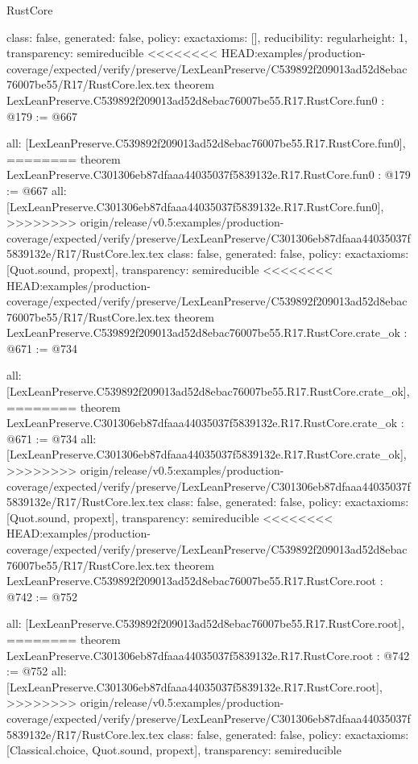 \begin{lexlean}{RustCore}
\begin{coremodule}
{\begin{coremodule}
{{{  class: false,
  generated: false,
  policy: exact{axioms: []},
  reducibility: regular{height: 1},
  transparency: semireducible
}
<<<<<<<< HEAD:examples/production-coverage/expected/verify/preserve/LexLeanPreserve/C539892f209013ad52d8ebac76007be55/R17/RustCore.lex.tex
theorem LexLeanPreserve.C539892f209013ad52d8ebac76007be55.R17.RustCore.fun0 : @179 := @667 {
  all: [LexLeanPreserve.C539892f209013ad52d8ebac76007be55.R17.RustCore.fun0],
========
theorem LexLeanPreserve.C301306eb87dfaaa44035037f5839132e.R17.RustCore.fun0 : @179 := @667 {
  all: [LexLeanPreserve.C301306eb87dfaaa44035037f5839132e.R17.RustCore.fun0],
>>>>>>>> origin/release/v0.5:examples/production-coverage/expected/verify/preserve/LexLeanPreserve/C301306eb87dfaaa44035037f5839132e/R17/RustCore.lex.tex
  class: false,
  generated: false,
  policy: exact{axioms: [Quot.sound, propext]},
  transparency: semireducible
}
<<<<<<<< HEAD:examples/production-coverage/expected/verify/preserve/LexLeanPreserve/C539892f209013ad52d8ebac76007be55/R17/RustCore.lex.tex
theorem LexLeanPreserve.C539892f209013ad52d8ebac76007be55.R17.RustCore.crate_ok : @671 := @734 {
  all: [LexLeanPreserve.C539892f209013ad52d8ebac76007be55.R17.RustCore.crate_ok],
========
theorem LexLeanPreserve.C301306eb87dfaaa44035037f5839132e.R17.RustCore.crate_ok : @671 := @734 {
  all: [LexLeanPreserve.C301306eb87dfaaa44035037f5839132e.R17.RustCore.crate_ok],
>>>>>>>> origin/release/v0.5:examples/production-coverage/expected/verify/preserve/LexLeanPreserve/C301306eb87dfaaa44035037f5839132e/R17/RustCore.lex.tex
  class: false,
  generated: false,
  policy: exact{axioms: [Quot.sound, propext]},
  transparency: semireducible
}
<<<<<<<< HEAD:examples/production-coverage/expected/verify/preserve/LexLeanPreserve/C539892f209013ad52d8ebac76007be55/R17/RustCore.lex.tex
theorem LexLeanPreserve.C539892f209013ad52d8ebac76007be55.R17.RustCore.root : @742 := @752 {
  all: [LexLeanPreserve.C539892f209013ad52d8ebac76007be55.R17.RustCore.root],
========
theorem LexLeanPreserve.C301306eb87dfaaa44035037f5839132e.R17.RustCore.root : @742 := @752 {
  all: [LexLeanPreserve.C301306eb87dfaaa44035037f5839132e.R17.RustCore.root],
>>>>>>>> origin/release/v0.5:examples/production-coverage/expected/verify/preserve/LexLeanPreserve/C301306eb87dfaaa44035037f5839132e/R17/RustCore.lex.tex
  class: false,
  generated: false,
  policy: exact{axioms: [Classical.choice, Quot.sound, propext]},
  transparency: semireducible
}

}}}}}
\end{coremodule}}
\end{coremodule}
\end{lexlean}
